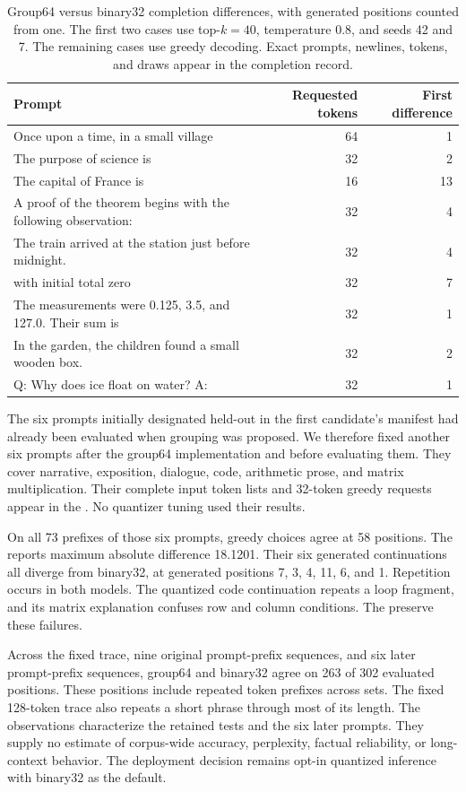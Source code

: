 \begin{table}[ht]
\centering
\small
\begin{tabular}{L{8.3cm}rr}
\toprule
Prompt & Requested tokens & First difference\\
\midrule
Once upon a time, in a small village & 64 & 1\\
The purpose of science is & 32 & 2\\
The capital of France is & 16 & 13\\
A proof of the theorem begins with the following observation: & 32 & 4\\
The train arrived at the station just before midnight. & 32 & 4\\
 with initial total zero & 32 & 7\\
The measurements were 0.125, 3.5, and 127.0. Their sum is & 32 & 1\\
In the garden, the children found a small wooden box. & 32 & 2\\
Q: Why does ice float on water? A: & 32 & 1\\
\bottomrule
\end{tabular}
\caption{Group64 versus binary32 completion differences, with generated positions counted from one.  The first two cases use top-$k=40$, temperature 0.8, and seeds 42 and 7.  The remaining cases use greedy decoding.  Exact prompts, newlines, tokens, and draws appear in the completion record.}
\label{tab:completions}
\end{table}

The six prompts initially designated held-out in the first candidate's manifest had already been evaluated when grouping was proposed.  We therefore fixed another six prompts after the group64 implementation and before evaluating them.  They cover narrative, exposition, dialogue, code, arithmetic prose, and matrix multiplication.  Their complete input token lists and 32-token greedy requests appear in the .  No quantizer tuning used their results.

On all 73 prefixes of those six prompts, greedy choices agree at 58 positions.  The  reports maximum absolute difference 18.1201.  Their six generated continuations all diverge from binary32, at generated positions 7, 3, 4, 11, 6, and 1.  Repetition occurs in both models.  The quantized code continuation repeats a loop fragment, and its matrix explanation confuses row and column conditions.  The  preserve these failures.

Across the fixed trace, nine original prompt-prefix sequences, and six later prompt-prefix sequences, group64 and binary32 agree on 263 of 302 evaluated positions.  These positions include repeated token prefixes across sets.  The fixed 128-token trace also repeats a short phrase through most of its length.  The observations characterize the retained tests and the six later prompts.  They supply no estimate of corpus-wide accuracy, perplexity, factual reliability, or long-context behavior.  The deployment decision remains opt-in quantized inference with binary32 as the default.

